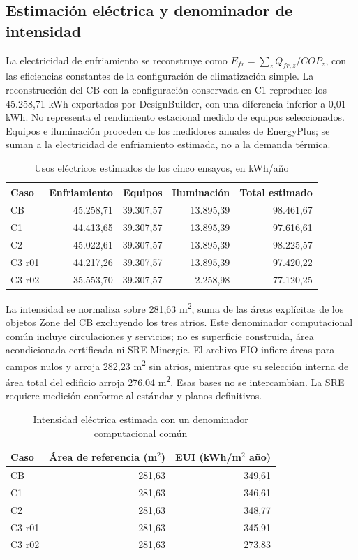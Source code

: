 \subsection{Estimación eléctrica y denominador de intensidad}
La electricidad de enfriamiento se reconstruye como $E_{fr}=\sum_z Q_{fr,z}/COP_z$, con las eficiencias constantes de la configuración de climatización simple. La reconstrucción del CB con la configuración conservada en C1 reproduce los 45.258,71 kWh exportados por DesignBuilder, con una diferencia inferior a 0,01 kWh. No representa el rendimiento estacional medido de equipos seleccionados. Equipos e iluminación proceden de los medidores anuales de EnergyPlus; se suman a la electricidad de enfriamiento estimada, no a la demanda térmica.
\begin{table}[H]\centering
\caption{Usos eléctricos estimados de los cinco ensayos, en kWh/año}
{\small\singlespacing\renewcommand{\arraystretch}{1.2}
\begin{tabular}{lrrrr}\toprule
Caso & Enfriamiento & Equipos & Iluminación & Total estimado \\ \midrule
CB & 45.258,71 & 39.307,57 & 13.895,39 & 98.461,67 \\
C1 & 44.413,65 & 39.307,57 & 13.895,39 & 97.616,61 \\
C2 & 45.022,61 & 39.307,57 & 13.895,39 & 98.225,57 \\
C3 r01 & 44.217,26 & 39.307,57 & 13.895,39 & 97.420,22 \\
C3 r02 & 35.553,70 & 39.307,57 & 2.258,98 & 77.120,25 \\
\bottomrule\end{tabular}}
\end{table}
La intensidad se normaliza sobre 281,63 m\textsuperscript{2}, suma de las áreas explícitas de los objetos Zone del CB excluyendo los tres atrios. Este denominador computacional común incluye circulaciones y servicios; no es superficie construida, área acondicionada certificada ni SRE Minergie. El archivo EIO infiere áreas para campos nulos y arroja 282,23 m\textsuperscript{2} sin atrios, mientras que su selección interna de área total del edificio arroja 276,04 m\textsuperscript{2}. Esas bases no se intercambian. La SRE requiere medición conforme al estándar y planos definitivos.
\begin{table}[H]\centering
\caption{Intensidad eléctrica estimada con un denominador computacional común}
{\small\singlespacing\renewcommand{\arraystretch}{1.2}
\begin{tabular}{lrr}\toprule
Caso & Área de referencia (m$^2$) & EUI (kWh/m$^2$ año) \\ \midrule
CB & 281,63 & 349,61 \\
C1 & 281,63 & 346,61 \\
C2 & 281,63 & 348,77 \\
C3 r01 & 281,63 & 345,91 \\
C3 r02 & 281,63 & 273,83 \\
\bottomrule\end{tabular}}
\end{table}
